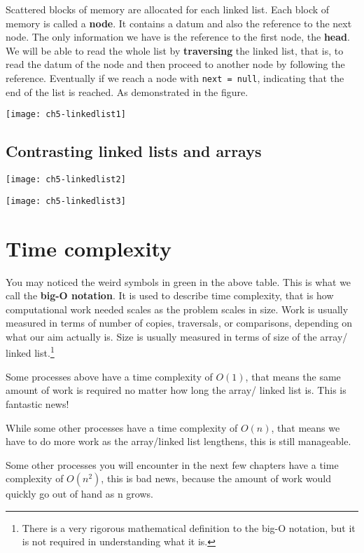 Scattered blocks of memory are allocated for each linked list. Each block of memory is called a \textbf{node}. It contains a datum and also the reference to the next node. The only information we have is the reference to the first node, the \textbf{head}. We will be able to read the whole list by \textbf{traversing} the linked list, that is, to read the datum of the node and then proceed to another node by following the reference. Eventually if we reach a node with \texttt{next = null}, indicating that the end of the list is reached. As demonstrated in the figure.

\texttt{[image: ch5-linkedlist1]}

\subsection{Contrasting linked lists and arrays}

\texttt{[image: ch5-linkedlist2]}

\texttt{[image: ch5-linkedlist3]}

\section{Time complexity}

You may noticed the weird symbols in green in the above table. This is what we call the \textbf{big-O notation}. It is used to describe time complexity, that is how computational work needed scales as the problem scales in size. Work is usually measured in terms of number of copies, traversals, or comparisons, depending on what our aim actually is. Size is usually measured in terms of size of the array/ linked list.\footnote{There is a very rigorous mathematical definition to the big-O notation, but it is not required in understanding what it is.}

Some processes above have a time complexity of $O(1)$, that means the same amount of work is required no matter how long the array/ linked list is. This is fantastic news! 

While some other processes have a time complexity of $O(n)$, that means we have to do more work as the array/linked list lengthens, this is still manageable. 

Some other processes you will encounter in the next few chapters have a time complexity of $O(n^2)$, this is bad news, because the amount of work would quickly go out of hand as n grows.

